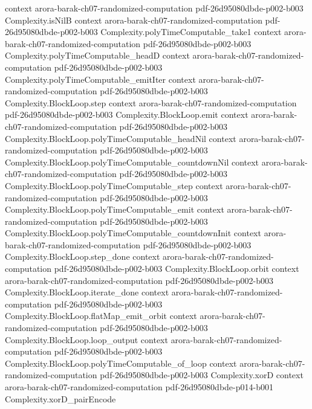 \begin{theorem}
  {context}
  {arora-barak-ch07-randomized-computation}
  {pdf-26d95080dbde-p002-b003}
\proofstep
  {Complexity.isNilB}
  {context}
  {arora-barak-ch07-randomized-computation}
  {pdf-26d95080dbde-p002-b003}
\proofstep
  {Complexity.polyTimeComputable_take1}
  {context}
  {arora-barak-ch07-randomized-computation}
  {pdf-26d95080dbde-p002-b003}
\proofstep
  {Complexity.polyTimeComputable_headD}
  {context}
  {arora-barak-ch07-randomized-computation}
  {pdf-26d95080dbde-p002-b003}
\proofstep
  {Complexity.polyTimeComputable_emitIter}
  {context}
  {arora-barak-ch07-randomized-computation}
  {pdf-26d95080dbde-p002-b003}
\proofstep
  {Complexity.BlockLoop.step}
  {context}
  {arora-barak-ch07-randomized-computation}
  {pdf-26d95080dbde-p002-b003}
\proofstep
  {Complexity.BlockLoop.emit}
  {context}
  {arora-barak-ch07-randomized-computation}
  {pdf-26d95080dbde-p002-b003}
\proofstep
  {Complexity.BlockLoop.polyTimeComputable_headNil}
  {context}
  {arora-barak-ch07-randomized-computation}
  {pdf-26d95080dbde-p002-b003}
\proofstep
  {Complexity.BlockLoop.polyTimeComputable_countdownNil}
  {context}
  {arora-barak-ch07-randomized-computation}
  {pdf-26d95080dbde-p002-b003}
\proofstep
  {Complexity.BlockLoop.polyTimeComputable_step}
  {context}
  {arora-barak-ch07-randomized-computation}
  {pdf-26d95080dbde-p002-b003}
\proofstep
  {Complexity.BlockLoop.polyTimeComputable_emit}
  {context}
  {arora-barak-ch07-randomized-computation}
  {pdf-26d95080dbde-p002-b003}
\proofstep
  {Complexity.BlockLoop.polyTimeComputable_countdownInit}
  {context}
  {arora-barak-ch07-randomized-computation}
  {pdf-26d95080dbde-p002-b003}
\proofstep
  {Complexity.BlockLoop.step_done}
  {context}
  {arora-barak-ch07-randomized-computation}
  {pdf-26d95080dbde-p002-b003}
\proofstep
  {Complexity.BlockLoop.orbit}
  {context}
  {arora-barak-ch07-randomized-computation}
  {pdf-26d95080dbde-p002-b003}
\proofstep
  {Complexity.BlockLoop.iterate_done}
  {context}
  {arora-barak-ch07-randomized-computation}
  {pdf-26d95080dbde-p002-b003}
\proofstep
  {Complexity.BlockLoop.flatMap_emit_orbit}
  {context}
  {arora-barak-ch07-randomized-computation}
  {pdf-26d95080dbde-p002-b003}
\proofstep
  {Complexity.BlockLoop.loop_output}
  {context}
  {arora-barak-ch07-randomized-computation}
  {pdf-26d95080dbde-p002-b003}
\proofstep
  {Complexity.BlockLoop.polyTimeComputable_of_loop}
  {context}
  {arora-barak-ch07-randomized-computation}
  {pdf-26d95080dbde-p002-b003}
\proofstep
  {Complexity.xorD}
  {context}
  {arora-barak-ch07-randomized-computation}
  {pdf-26d95080dbde-p014-b001}
\proofstep
  {Complexity.xorD_pairEncode}

\end{theorem}
